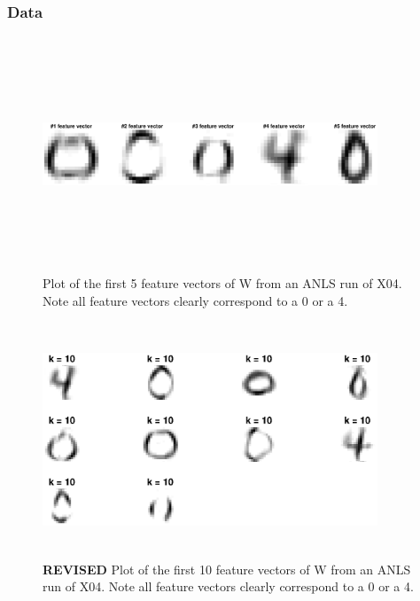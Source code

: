 \documentclass{article}
\begin{document}
\subsubsection*{Data}

\begin{figure}[H]
    \centerline
    {
    \includegraphics[width=10cm, height=7cm]{Q2_b_5FV}
    }
    \caption{\label{fig:my figure} Plot of the first 5 feature vectors of W from an ANLS run of X04.  Note all feature vectors clearly correspond to a 0 or a 4.}
\end{figure}

\begin{figure}[H]
    \centerline
    {
    \includegraphics[width=10cm, height=7cm]{Q2_b_10FV}
    }
    \caption{\label{fig:my figure}\textbf{REVISED} Plot of the first 10 feature vectors of W from an ANLS run of X04.  Note all feature vectors clearly correspond to a 0 or a 4.}
\end{figure}
\end{document}
